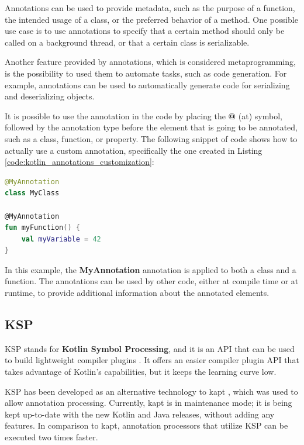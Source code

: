 Annotations can be used to provide metadata, such as the purpose of a function, the intended usage of a class, or the preferred behavior of a method. One possible use case is to use annotations to specify that a certain method should only be called on a background thread, or that a certain class is serializable.

Another feature provided by annotations, which is considered metaprogramming, is the possibility to used them to automate tasks, such as code generation. For example, annotations can be used to automatically generate code for serializing and deserializing objects.

It is possible to use the annotation in the code by placing the \textbf{@} (at) symbol, followed by the annotation type before the element that is going to be annotated, such as a class, function, or property.\newline
The following snippet of code shows how to actually use a custom annotation, specifically the one created in Listing \ref{code:kotlin_annotations_customization}:
\begin{lstlisting}[caption={Example of usage of a custom annotation in Kotlin}, language=Kotlin, captionpos=b, label={code:kotlin_annotations_usage}]
@MyAnnotation
class MyClass

@MyAnnotation
fun myFunction() {
    val myVariable = 42
}
\end{lstlisting}
In this example, the \textbf{MyAnnotation} annotation is applied to both a class and a function. The annotations can be used by other code, either at compile time or at runtime, to provide additional information about the annotated elements.

\subsection{KSP}\label{section:ksp}
KSP stands for \textbf{Kotlin Symbol Processing}, and it is an API that can be used to build lightweight compiler plugins \cite{ksp_documentation}. It offers an easier compiler plugin API that takes advantage of Kotlin's capabilities, but it keeps the learning curve low.

KSP has been developed as an alternative technology to kapt \cite{kapt_documentation}, which was used to allow annotation processing. Currently, kapt is in maintenance mode; it is being kept up-to-date with the new Kotlin and Java releases, without adding any features.\newline
In comparison to kapt, annotation processors that utilize KSP can be executed two times faster.

